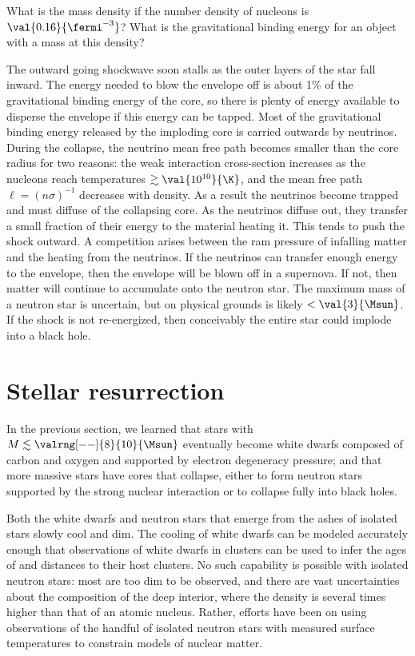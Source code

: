 \begin{exercisebox}
What is the mass density if the number density of nucleons is $\val{0.16}{\fermi^{-3}}$? What is the gravitational binding energy for an object with a mass  at this density?
\end{exercisebox}

The outward going shockwave soon stalls as the outer layers of the star fall inward. The energy needed to blow the envelope off is about 1\% of the gravitational binding energy of the core, so there is plenty of energy available to disperse the envelope if this energy can be tapped. Most of the gravitational binding energy released by the imploding core is carried outwards by neutrinos. 
During the collapse, the neutrino mean free path becomes smaller than the core radius for two reasons: the weak interaction cross-section increases as the nucleons reach temperatures $\gtrsim\val{10^{10}}{\K}$, and the mean free path $\ell = (n\sigma)^{-1}$ decreases with density. 
As a result the neutrinos become trapped and must diffuse of the collapsing core. As the neutrinos diffuse out, they transfer a small fraction of their energy to the material heating it. This tends to push the shock outward. A competition arises between the ram pressure of infalling matter and the heating from the neutrinos. If the neutrinos can transfer enough energy to the envelope, then the envelope will be blown off in a supernova. If not, then matter will continue to accumulate onto the neutron star. The maximum mass of a neutron star is uncertain, but on physical grounds is likely $< \val{3}{\Msun}$. If the shock is not re-energized, then conceivably the entire star could implode into a black hole.

\section{Stellar resurrection}
\label{s.stellar-resurrection}

In the previous section, we learned that stars with $M\lesssim\valrng[--]{8}{10}{\Msun}$ eventually become white dwarfs composed of carbon and oxygen and supported by electron degeneracy pressure; and that more massive stars have cores that collapse, either to form neutron stars supported by the strong nuclear interaction or to collapse fully into black holes.

Both the white dwarfs and neutron stars that emerge from the ashes of isolated stars slowly cool and dim. The cooling of white dwarfs can be modeled accurately enough that observations of white dwarfs in clusters can be used to infer the ages of and distances to their host clusters. No such capability is possible with isolated neutron stars: most are too dim to be observed, and there are vast uncertainties about the composition of the deep interior, where the density is several times higher than that of an atomic nucleus. Rather, efforts have been on using observations of the handful of isolated neutron stars with measured surface temperatures to constrain models of nuclear matter.

